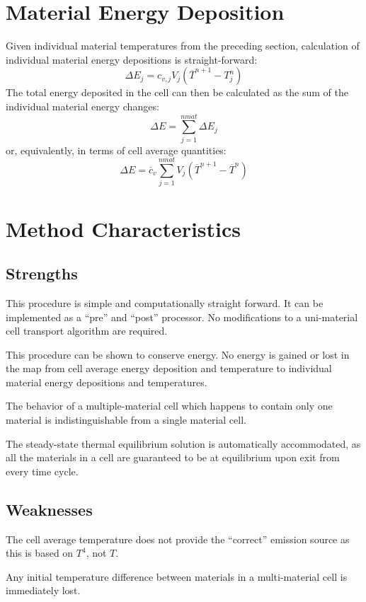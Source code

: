 \documentclass[12pt]{article}
\begin{document}
\section{Material Energy Deposition}
Given individual material temperatures from the preceding section,
calculation of individual material energy depositions is straight-forward:
\begin{equation}
\Delta E_{j} = c_{v,j} V_{j} (\overline{T}^{n+1}-T_{j}^{n})
\end{equation}
The total energy deposited in the cell can then be calculated as
the sum of the individual material energy changes:
\begin{equation}
\Delta E = \sum_{j=1}^{nmat} \Delta E_{j}
\end{equation}
or, equivalently, in terms of cell average quantities:
\begin{equation}
\Delta E = \overline{c}_{v}\sum_{j=1}^{nmat} V_{j}
(\overline{T}^{n+1} - \overline{T}^{n})
\end{equation}


\section{Method Characteristics}

\subsection{Strengths}

This procedure is simple and computationally straight forward. It
can be implemented as a ``pre'' and ``post'' processor. No 
modifications to a uni-material cell transport algorithm are required.

This procedure can be shown to conserve energy. No energy is gained or
lost in the map from cell average energy deposition and temperature to
individual material energy depositions and temperatures.

The behavior of a multiple-material cell which happens to contain
only  one material is indistinguishable from a single material cell.

The steady-state thermal equilibrium solution is automatically 
accommodated, as all the materials in a cell are guaranteed to be at
equilibrium upon exit from every time cycle.

\subsection{Weaknesses}

The cell average temperature does not provide the ``correct''
emission source as this is based on $T^4$, not $T$.

Any initial temperature difference between materials in a 
multi-material cell is immediately lost.

\nocite{MihalasMihalas}


\end{document}
